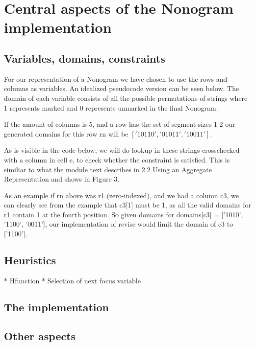 
\section{Central aspects of the Nonogram implementation}
\subsection{Variables, domains, constraints}
For our representation of a Nonogram we have chosen to
use the rows and columns as variables. An idealized pseudocode
version can be seen below. The domain of each variable consists
of all the possible permutations of strings where 1 represents
marked and 0 represents unmarked in the final Nonogram.

If the amount of columns is 5, and a row has the set of segment
sizes {1 2} our generated domains for this row rn will be
$ ['10110', '01011', '10011'] $.

As is visible in the code below, we will do lookup in these strings
crosschecked with a column in cell c, to check whether the constraint
is satisfied. This is similiar to what the module text describes in
2.2 Using an Aggregate Representation and shows in Figure 3.

As an example if rn above was r1 (zero-indexed), and we had a column
c3, we can clearly see from the example that c3[1] must be 1, as all the
valid domains for r1 contain 1 at the fourth position. So given domains
for domains[c3] = ['1010', '1100', '0011'], our implementation of revise
would limit the domain of c3 to ['1100'].



\subsection{Heuristics}
* H\-function
* Selection of next focus variable

\subsection*{The implementation}

\subsection{Other aspects}
